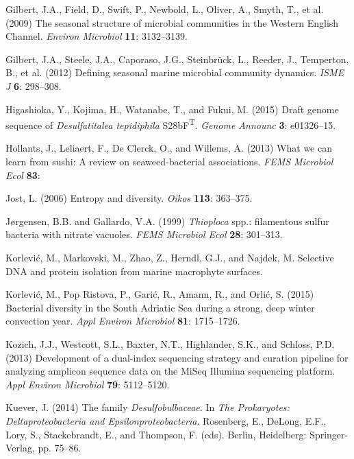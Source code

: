 \documentclass[12pt,]{article}
\begin{document}
\leavevmode\hypertarget{ref-Gilbert2009}{}%
Gilbert, J.A., Field, D., Swift, P., Newbold, L., Oliver, A., Smyth, T.,
et al. (2009) The seasonal structure of microbial communities in the
Western English Channel. \emph{Environ Microbiol} \textbf{11}:
3132--3139.

\leavevmode\hypertarget{ref-Gilbert2012}{}%
Gilbert, J.A., Steele, J.A., Caporaso, J.G., Steinbrück, L., Reeder, J.,
Temperton, B., et al. (2012) Defining seasonal marine microbial
community dynamics. \emph{ISME J} \textbf{6}: 298--308.

\leavevmode\hypertarget{ref-Higashioka2015}{}%
Higashioka, Y., Kojima, H., Watanabe, T., and Fukui, M. (2015) Draft
genome sequence of \emph{Desulfatitalea tepidiphila}
S28bF\textsuperscript{T}. \emph{Genome Announc} \textbf{3}: e01326--15.

\leavevmode\hypertarget{ref-Hollants2013}{}%
Hollants, J., Leliaert, F., De Clerck, O., and Willems, A. (2013) What
we can learn from sushi: A review on seaweed-bacterial associations.
\emph{FEMS Microbiol Ecol} \textbf{83}:

\leavevmode\hypertarget{ref-Jost2006}{}%
Jost, L. (2006) Entropy and diversity. \emph{Oikos} \textbf{113}:
363--375.

\leavevmode\hypertarget{ref-Jorgensen1999}{}%
Jørgensen, B.B. and Gallardo, V.A. (1999) \emph{Thioploca} spp.:
filamentous sulfur bacteria with nitrate vacuoles. \emph{FEMS Microbiol
Ecol} \textbf{28}: 301--313.

\leavevmode\hypertarget{ref-Korlevic}{}%
Korlević, M., Markovski, M., Zhao, Z., Herndl, G.J., and Najdek, M.
Selective DNA and protein isolation from marine macrophyte surfaces.

\leavevmode\hypertarget{ref-Korlevic2015}{}%
Korlević, M., Pop Ristova, P., Garić, R., Amann, R., and Orlić, S.
(2015) Bacterial diversity in the South Adriatic Sea during a strong,
deep winter convection year. \emph{Appl Environ Microbiol} \textbf{81}:
1715--1726.

\leavevmode\hypertarget{ref-Kozich2013}{}%
Kozich, J.J., Westcott, S.L., Baxter, N.T., Highlander, S.K., and
Schloss, P.D. (2013) Development of a dual-index sequencing strategy and
curation pipeline for analyzing amplicon sequence data on the MiSeq
Illumina sequencing platform. \emph{Appl Environ Microbiol} \textbf{79}:
5112--5120.

\leavevmode\hypertarget{ref-Kuever2014}{}%
Kuever, J. (2014) The family \emph{Desulfobulbaceae}. In \emph{The
Prokaryotes: Deltaproteobacteria and Epsilonproteobacteria}. Rosenberg,
E., DeLong, E.F., Lory, S., Stackebrandt, E., and Thompson, F. (eds).
Berlin, Heidelberg: Springer-Verlag, pp. 75--86.
\end{document}
